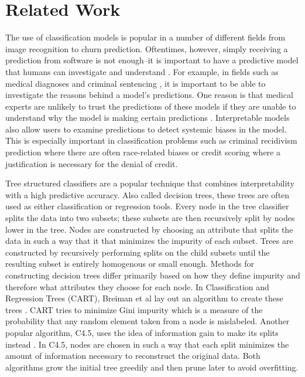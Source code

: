 
\chapter{Related Work}

The use of classification models is popular in a number of different fields from image recognition to churn prediction.
Oftentimes, however, simply receiving a prediction from software is not enough--it is important to have a predictive model that humans can investigate and understand \cite{Ruping06, Bratko97, Quinlan99, Martens11, Freitas14}.
For example, in fields such as medical diagnoses \cite{BellazziZu08} and criminal sentencing \cite{LarsonMaKiAn16}, it is important to be able to investigate the reasons behind a model's predictions.
One reason is that medical experts are unlikely to trust the predictions of these models if they are unable to understand why the model is making certain predictions \cite{Lavrač99}.
Interpretable models also allow users to examine predictions to detect systemic biases in the model.
This is especially important in classification problems such as criminal recidivism prediction where there are often race-related biases\cite{LarsonMaKiAn16} or credit scoring where a justification is necessary for the denial of credit\cite{BaesensMuDeVaSe05}.

Tree structured classifiers are a popular technique that combines interpretability with a high predictive accuracy.
Also called decision trees, these trees are often used as either classification or regression tools.
Every node in the tree classifier splits the data into two subsets; these subsets are then recursively split by nodes lower in the tree.
Nodes are constructed by choosing an attribute that splits the data in such a way that it that minimizes the impurity of each subset.
Trees are constructed by recursively performing splits on the child subsets until the resulting subset is entirely homogenous or small enough.
Methods for constructing decision trees differ primarily based on how they define impurity and therefore what attributes they choose for each node.
In Classification and Regression Trees (CART), Breiman et al lay out an algorithm to create these trees \cite{BreimanFrOlSt84}.
CART tries to minimize Gini impurity which is a measure of the probability that any random element taken from a node is mislabeled.
Another popular algorithm, C4.5, uses the idea of information gain to make its splits instead \cite{Quinlan93}.
In C4.5, nodes are chosen in such a way that each split minimizes the amount of information necessary to reconstruct the original data.
Both algorithms grow the initial tree greedily and then prune later to avoid overfitting.

